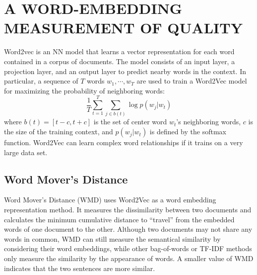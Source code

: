 \documentclass[a4paper,twoside]{article}
\begin{document}
\section{\uppercase{A Word-Embedding Measurement of Quality}}
\label{sect:emethod}

\noindent Word2vec \cite{mikolov13,mikolov2013}
is an NN model that learns a vector representation for each word contained in a corpus of documents.
The model consists of an input layer, a projection layer, and an output layer to predict nearby words in the context. In particular,
a sequence of $T$ words $w_1, \cdots, w_T$ are used to train a Word2Vec model for maximizing the probability of neighboring words:
\begin{equation} \label{eq5}
{\frac{1}{T}\sum_{t=1}^{T}{\sum_{j\in b(t)}{\log p(w_j|w_t)}}}
\end{equation}
where $b(t) = [t-c, t + c]$ is the set of center word $w_t$'s neighboring words, $c$ is the size of the training context, and $p(w_j|w_t)$ is defined by the softmax function.
Word2Vec can learn complex word relationships if it trains on a very large data set.

\subsection{Word Mover's Distance}
\label{ssec:wmd}
Word Mover's Distance (WMD) \cite{wmd} uses Word2Vec as a word embedding representation method.
It measures the dissimilarity between two documents and calculates the minimum cumulative distance to ``travel'' from the embedded words of one document to the other. Although two documents may not share any words in common, WMD can still measure the semantical similarity by considering their word embeddings, while other bag-of-words or TF-IDF methods only measure the similarity by the appearance of words. A smaller value of WMD indicates that the two sentences are more similar.
\end{document}
